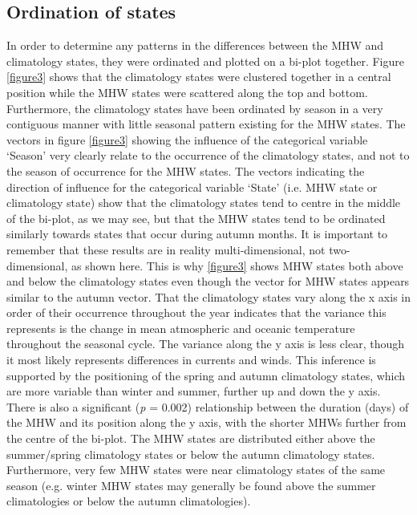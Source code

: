 \documentclass[utf8]{frontiersSCNS}
\begin{document}
\subsection{Ordination of states}
In order to determine any patterns in the differences between the MHW and climatology states, they were ordinated and plotted on a bi-plot together. Figure \ref{figure3} shows that the climatology states were clustered together in a central position while the MHW states were scattered along the top and bottom. Furthermore, the climatology states have been ordinated by season in a very contiguous manner with little seasonal pattern existing for the MHW states. The vectors in figure \ref{figure3} showing the influence of the categorical variable `Season' very clearly relate to the occurrence of the climatology states, and not to the season of occurrence for the MHW states. The vectors indicating the direction of influence for the categorical variable `State' (i.e. MHW state or climatology state) show that the climatology states tend to centre in the middle of the bi-plot, as we may see, but that the MHW states tend to be ordinated similarly towards states that occur during autumn months. It is important to remember that these results are in reality multi-dimensional, not two-dimensional, as shown here. This is why \ref{figure3} shows MHW states both above and below the climatology states even though the vector for MHW states appears similar to the autumn vector. That the climatology states vary along the x axis in order of their occurrence throughout the year indicates that the variance this represents is the change in mean atmospheric and oceanic temperature throughout the seasonal cycle. The variance along the y axis is less clear, though it most likely represents differences in currents and winds. This inference is supported by the positioning of the spring and autumn climatology states, which are more variable than winter and summer, further up and down the y axis. There is also a significant (\emph{p} = 0.002) relationship between the duration (days) of the MHW and its position along the y axis, with the shorter MHWs further from the centre of the bi-plot. The MHW states are distributed either above the summer/spring climatology states or below the autumn climatology states. Furthermore, very few MHW states were near climatology states of the same season (e.g. winter MHW states may generally be found above the summer climatologies or below the autumn climatologies). 


\end{document}
